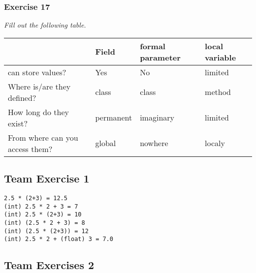 \subsubsection*{Exercise 17}
\textit{Fill out the following table.}\\

\begin{table}[h!]
\centering
\begin{tabular}{l | l | l | l}
	& \textbf{Field}
		& \textbf{formal parameter}
			& \textbf{local variable} \\
	\hline
can store values?
	& Yes
		& No
			& limited \\
Where is/are they defined?
	& class
		& class
			& method\\
How long do they exist?
	& permanent
		& imaginary
			& limited\\
From where can you access them?
	& global
		& nowhere
			& localy
\end{tabular}
\end{table}

\subsection{Team Exercise 1}
\begin{lstlisting}
2.5 * (2+3) = 12.5
(int) 2.5 * 2 + 3 = 7
(int) 2.5 * (2+3) = 10
(int) (2.5 * 2 + 3) = 8
(int) (2.5 * (2+3)) = 12
(int) 2.5 * 2 + (float) 3 = 7.0
\end{lstlisting}

\subsection{Team Exercises 2}

